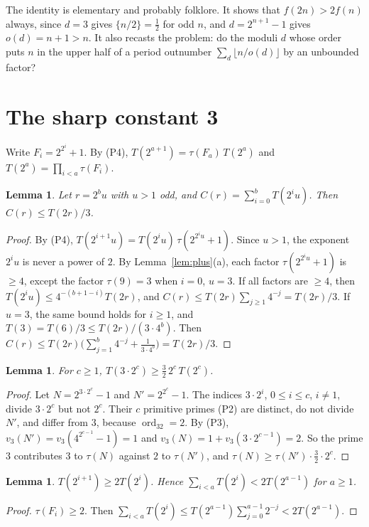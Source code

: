 \documentclass[11pt]{amsart}
\newtheorem{lemma}[theorem]{Lemma}
\theoremstyle{definition}
\theoremstyle{remark}
\newcommand{\ord}{\operatorname{ord}}
\begin{document}
The identity is elementary and probably folklore. It shows that $f(2n)>2f(n)$ always, since
$d=3$ gives $\{n/2\}=\frac12$ for odd $n$, and $d=2^{n+1}-1$ gives $o(d)=n+1>n$.
It also recasts the problem: do the moduli $d$ whose order puts $n$ in the upper half of a period outnumber
$\sum_d\lfloor n/o(d)\rfloor$ by an unbounded factor?

\section{The sharp constant 3}

Write $F_i=2^{2^i}+1$. By (P4), $T(2^{a+1})=\tau(F_a)\,T(2^a)$ and $T(2^a)=\prod_{i<a}\tau(F_i)$.

\begin{lemma}\label{lem:Cr}
Let $r=2^bu$ with $u>1$ odd, and $C(r)=\sum_{i=0}^{b}T(2^iu)$. Then $C(r)\le T(2r)/3$.
\end{lemma}
\begin{proof}
By (P4), $T(2^{i+1}u)=T(2^iu)\,\tau(2^{2^iu}+1)$. Since $u>1$, the exponent $2^iu$ is never a power of $2$.
By Lemma~\ref{lem:plus}(a), each factor $\tau(2^{2^iu}+1)$ is $\ge4$, except the factor $\tau(9)=3$ when $i=0$, $u=3$.
If all factors are $\ge4$, then $T(2^iu)\le4^{-(b+1-i)}T(2r)$, and $C(r)\le T(2r)\sum_{j\ge1}4^{-j}=T(2r)/3$.
If $u=3$, the same bound holds for $i\ge1$, and $T(3)=T(6)/3\le T(2r)/(3\cdot4^b)$. Then
$C(r)\le T(2r)\bigl(\sum_{j=1}^{b}4^{-j}+\frac{1}{3\cdot4^b}\bigr)=T(2r)/3$.
\end{proof}

\begin{lemma}\label{lem:3pow}
For $c\ge1$, $T(3\cdot2^c)\ge\frac32\,2^c\,T(2^c)$.
\end{lemma}
\begin{proof}
Let $N=2^{3\cdot2^c}-1$ and $N'=2^{2^c}-1$. The indices $3\cdot2^i$, $0\le i\le c$, $i\ne1$, divide $3\cdot2^c$ but not
$2^c$. Their $c$ primitive primes (P2) are distinct, do not divide $N'$, and differ from $3$, because $\ord_32=2$.
By (P3), $v_3(N')=v_3(4^{2^{c-1}}-1)=1$ and $v_3(N)=1+v_3(3\cdot2^{c-1})=2$. So the prime $3$ contributes
$3$ to $\tau(N)$ against $2$ to $\tau(N')$, and $\tau(N)\ge\tau(N')\cdot\frac32\cdot2^c$.
\end{proof}

\begin{lemma}\label{lem:fermatsum}
$T(2^{i+1})\ge2T(2^i)$. Hence $\sum_{i<a}T(2^i)<2T(2^{a-1})$ for $a\ge1$.
\end{lemma}
\begin{proof}
$\tau(F_i)\ge2$. Then $\sum_{i<a}T(2^i)\le T(2^{a-1})\sum_{j=0}^{a-1}2^{-j}<2T(2^{a-1})$.
\end{proof}
\end{document}
